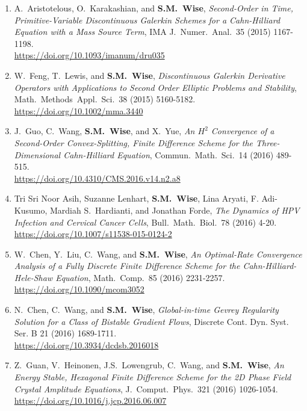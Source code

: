 \documentclass[11pt]{letter}
\begin{document}
\begin{enumerate}
	\item
A.~Aristotelous, O.~Karakashian, and \textbf{S.M.~Wise}, {\sl Second-Order in Time, Primitive-Variable Discontinuous Galerkin Schemes for a Cahn-Hilliard Equation with a Mass Source Term}, IMA J.~Numer.~Anal.~35 (2015) 1167-1198.
	\\ 
\url{https://doi.org/10.1093/imanum/dru035} 

	\item    
W.~Feng, T.~Lewis, and \textbf{S.M.~Wise}, {\sl Discontinuous Galerkin Derivative Operators with Applications to Second Order Elliptic Problems and Stability}, Math.~Methods~Appl.~Sci.~38 (2015) 5160-5182.
	\\ 
\url{https://doi.org/10.1002/mma.3440}  

	\item
J.~Guo, C.~Wang, \textbf{S.M.~Wise}, and X.~Yue, {\sl An $H^2$ Convergence of a Second-Order Convex-Splitting, Finite Difference Scheme for the Three-Dimensional Cahn-Hilliard Equation}, Commun.~Math.~Sci.~14 (2016) 489-515.
	\\ 
\url{https://doi.org/10.4310/CMS.2016.v14.n2.a8}

	\item
Tri Sri Noor Asih, Suzanne Lenhart, \textbf{S.M.~Wise}, Lina Aryati, F. Adi-Kusumo, Mardiah S.~Hardianti, and Jonathan Forde, {\sl The Dynamics of HPV Infection and Cervical Cancer Cells}, Bull.~Math.~Biol.~78 (2016) 4-20.
	\\ 
\url{https://doi.org/10.1007/s11538-015-0124-2}

	\item
W.~Chen, Y.~Liu, C.~Wang, and \textbf{S.M.~Wise}, {\sl An Optimal-Rate Convergence Analysis of a Fully Discrete Finite Difference Scheme for the Cahn-Hilliard-Hele-Shaw Equation}, Math.~Comp.~85 (2016) 2231-2257.
	\\ 
\url{https://doi.org/10.1090/mcom3052}

	\item
N.~Chen, C.~Wang, and \textbf{S.M.~Wise}, {\sl Global-in-time Gevrey Regularity Solution for a Class of Bistable Gradient Flows}, Discrete Cont. Dyn. Syst. Ser. B 21 (2016) 1689-1711.
	\\ 
\url{https://doi.org/10.3934/dcdsb.2016018}

	\item
Z.~Guan, V.~Heinonen, J.S.~Lowengrub, C.~Wang, and \textbf{S.M.~Wise}, {\sl An Energy Stable, Hexagonal Finite Difference Scheme for the 2D Phase Field Crystal Amplitude Equations}, J.~Comput.~Phys.~321 (2016) 1026-1054.
	\\ 
\url{https://doi.org/10.1016/j.jcp.2016.06.007}


\end{enumerate}
\end{document}
